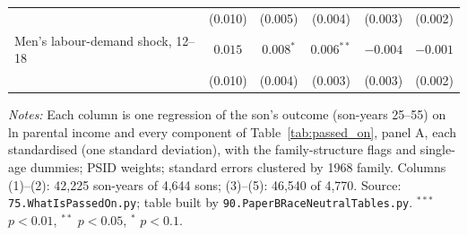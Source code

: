 \begin{table}[!htbp]
{{\begin{tabular}{lccccc}
 & (0.010) & (0.005) & (0.004) & (0.003) & (0.002) \\
Men's labour-demand shock, 12--18 & $0.015$ & $0.008^{*}$ & $0.006^{**}$ & $-0.004$ & $-0.001$ \\
 & (0.010) & (0.004) & (0.003) & (0.003) & (0.002) \\
\bottomrule
\end{tabular}}}
\par\smallskip
\begin{minipage}{\textwidth}\footnotesize \textit{Notes:} Each column is one regression of the son's outcome (son-years 25--55) on ln parental income and every component of Table~\ref{tab:passed_on}, panel A, each standardised (one standard deviation), with the family-structure flags and single-age dummies; PSID weights; standard errors clustered by 1968 family. Columns (1)--(2): 42,225 son-years of 4,644 sons; (3)--(5): 46,540 of 4,770. Source: \texttt{75.WhatIsPassedOn.py}; table built by \texttt{90.PaperBRaceNeutralTables.py}. $^{***}$ $p<0.01$, $^{**}$ $p<0.05$, $^{*}$ $p<0.1$.\end{minipage}
\end{table}
